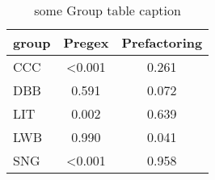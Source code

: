 \begin{table}\begin{small}\begin{center}\caption{some Group table caption}\label{table:groupANOVATable}\begin{tabular}
{lcc}
group & Pregex & Prefactoring \\
\toprule[0.16em]
CCC & <0.001 & 0.261\\
DBB & 0.591 & 0.072\\
LIT & 0.002 & 0.639\\
LWB & 0.990 & 0.041\\
SNG & <0.001 & 0.958\\
\bottomrule[0.13em]\end{tabular}\end{center}\end{small}\end{table}
